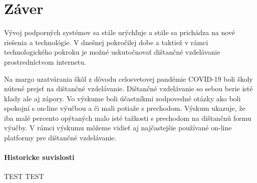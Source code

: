 \documentclass[10pt,oneside,slovak,a4paper]{article}
\begin{document}
\section*{Záver}
Vývoj podporných systémov sa stále urýchľuje a stále sa prichádza na nové riešenia a technológie. V dnešnej pokročilej dobe a taktiež v rámci technologického pokroku je možné uskutočnovať dištančné vzdelávanie prostredníctvom internetu.

Na margo uzatvárania škôl z dôvodu celosvetovej pandémie COVID-19 boli školy nútené prejsť na dištančné vzdelávanie. Dištančné vzdelávanie so sebou berie isté klady ale aj zápory. Vo výskume boli účastníkmi zodpovedné otázky ako boli spokojní s on-line výučbou a či mali potiaže s prechodom.
Výskum ukazuje, že iba malé percento opýtaných malo isté tažkosti s prechodom na dištančnú formu výučby. V rámci výskumu môžeme vidieť aj najčastejšie používané on-line platformy pre dištančné vzdelávanie.
\paragraph{Historicke suvislosti} TEST TEST




\end{document}
